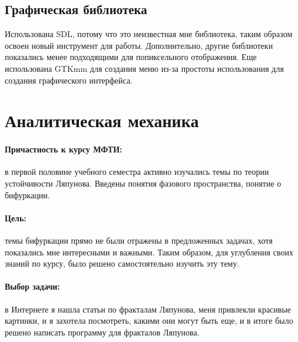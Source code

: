\documentclass[a5paper,10pt, twoside]{article} %
\begin{document}
  \subsection{Графическая библиотека}

	Использована SDL, потому что это неизвестная мне библиотека, таким образом освоен новый инструмент для работы.
  Дополнительно, другие библиотеки показались менее подходящими для попиксельного отображения.
  Еще использована GTKmm для создания меню из-за простоты использования для создания графического интерфейса.

\section{Аналитическая механика}

    \paragraph{Причастность к курсу МФТИ: }

    в первой половине учебного семестра активно изучались темы по теории устойчивости Ляпунова.
    Введены понятия фазового пространства, понятие о бифуркации. 

    \paragraph{Цель: }
    темы бифуркации прямо не были отражены в предложенных задачах, хотя показались мне 
    интересными и важными. Таким образом, для углубления своих знаний по курсу, было решено 
    самостоятельно изучить эту тему.
    
    \paragraph{Выбор задачи: }
    в Интернете я нашла статьи по фракталам Ляпунова, меня привлекли красивые картинки, и я 
    захотела посмотреть, какими они могут быть еще, и в итоге было решено написать программу 
    для фракталов Ляпунова.
\end{document}

